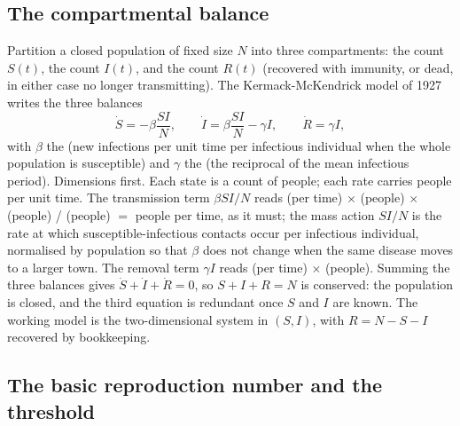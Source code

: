 \subsection{The compartmental balance}

Partition a closed population of fixed size $N$ into three
compartments: the  count $S(t)$, the
 count $I(t)$, and the  count
$R(t)$ (recovered with immunity, or dead, in either case no longer
transmitting). The Kermack-McKendrick model of 1927 writes the three
balances
\[
\dot{S} = -\beta \frac{S I}{N}, \qquad
\dot{I} = \beta \frac{S I}{N} - \gamma I, \qquad
\dot{R} = \gamma I,
\]
with $\beta$ the  (new infections per unit
time per infectious individual when the whole population is
susceptible) and $\gamma$ the  (the reciprocal
of the mean infectious period). Dimensions first. Each state is a
count of people; each rate carries people per unit time. The
transmission term $\beta S I/N$ reads (per time) $\times$ (people)
$\times$ (people) / (people) $=$ people per time, as it must; the mass
action $S I/N$ is the rate at which susceptible-infectious contacts
occur per infectious individual, normalised by population so that
$\beta$ does not change when the same disease moves to a larger town.
The removal term $\gamma I$ reads (per time) $\times$ (people).
Summing the three balances gives $\dot{S} + \dot{I} + \dot{R} = 0$, so
$S + I + R = N$ is conserved: the population is closed, and the third
equation is redundant once $S$ and $I$ are known. The working model is
the two-dimensional system in $(S, I)$, with $R = N - S - I$ recovered
by bookkeeping.

\subsection{The basic reproduction number and the threshold}

